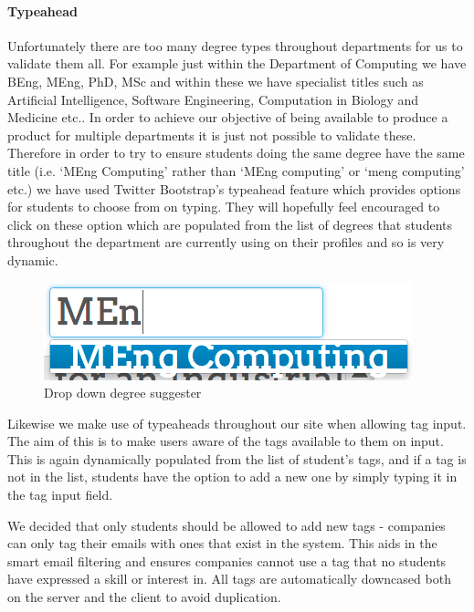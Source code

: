     \paragraph{Typeahead} Unfortunately there are too many degree types throughout departments for us to validate them all. For example just within the Department of Computing we have BEng, MEng, PhD, MSc and within these we have specialist titles such as Artificial Intelligence, Software Engineering, Computation in Biology and Medicine etc.\cite{doc-ug-degrees}. In order to achieve our objective of being available to produce a product for multiple departments it is just not possible to validate these. Therefore in order to try to ensure students doing the same degree have the same title (i.e. `MEng Computing' rather than `MEng computing' or `meng computing' etc.) we have used Twitter Bootstrap's\cite{bootstrap} typeahead feature which provides options for students to choose from on typing. They will hopefully feel encouraged to click on these option which are populated from the list of degrees that students throughout the department are currently using on their profiles and so is very dynamic.

    \begin{figure}[H]\centering
    \includegraphics[scale=0.5]{images/design/edit_suggestions}
    \caption{Drop down degree suggester}
    \end{figure}

    Likewise we make use of typeaheads throughout our site when allowing tag input. The aim of this is to make users aware of the tags available to them on input. This is again dynamically populated from the list of student's tags, and if a tag is not in the list, students have the option to add a new one by simply typing it in the tag input field. 

    We decided that only students should be allowed to add new tags - companies can only tag their emails with ones that exist in the system. This aids in the smart email filtering and ensures companies cannot use a tag that no students have expressed a skill or interest in.
    All tags are automatically downcased both on the server and the client to avoid duplication.

